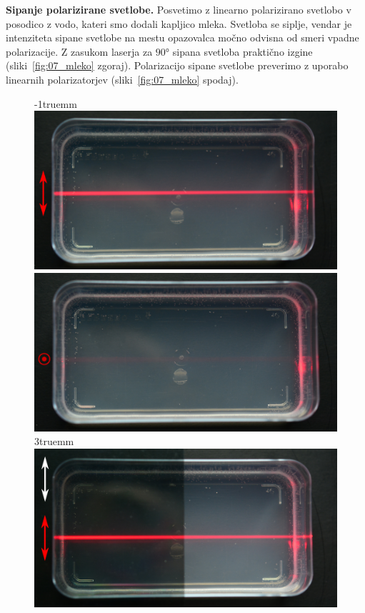 \begin{example}{\bf Sipanje polarizirane svetlobe.} Posvetimo z linearno polarizirano
svetlobo v posodico z vodo, kateri smo dodali kapljico mleka. Svetloba se siplje,
vendar je intenziteta sipane svetlobe na mestu opazovalca močno odvisna
od smeri vpadne polarizacije. Z zasukom laserja za $90\si{\degree}$
sipana svetloba praktično izgine (sliki~\ref{fig:07_mleko} zgoraj). 
Polarizacijo sipane svetlobe preverimo z uporabo linearnih polarizatorjev 
(sliki~\ref{fig:07_mleko} spodaj). 
\begin{figure}[!ht]
\centering
\vglue-1truemm
\includegraphics[width=7truecm]{slike/07_Mleko1.jpg}\hfill
\includegraphics[width=7truecm]{slike/07_Mleko2.jpg}\\ \vglue3truemm
\includegraphics[width=7truecm]{slike/07_Mleko3.jpg}\hfill

\end{figure}
\end{example}
